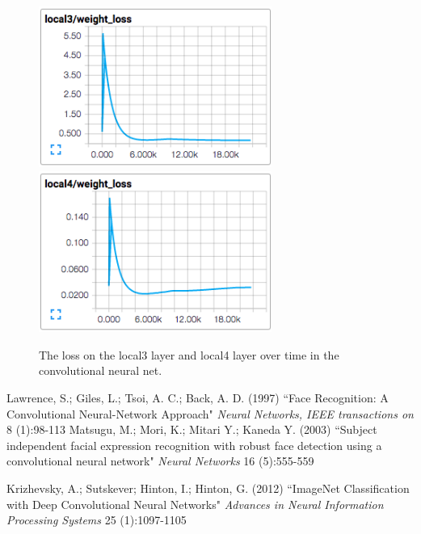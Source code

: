 \documentclass[11pt, twocolumn, twoside]{article}
\begin{document}
\begin{figure}
	\centering
	\includegraphics[width=3in]{local3_loss}
	\includegraphics[width=3in]{local4_loss}
	\caption{The loss on the local3 layer and local4 layer over time in the convolutional neural net.}
	\label{fig:layer_loss}
\end{figure}


\begin{thebibliography}{9}
Lawrence, S.; Giles, L.; Tsoi, A. C.; Back, A. D. (1997)
``Face Recognition: A Convolutional Neural-Network Approach"
\textit{Neural Networks, IEEE transactions on} 8 (1):98-113
Matsugu, M.; Mori, K.; Mitari Y.; Kaneda Y. (2003)
``Subject independent facial expression recognition with robust face detection using a convolutional neural network"
\textit{Neural Networks} 16 (5):555-559


Krizhevsky, A.; Sutskever; Hinton, I.; Hinton, G. (2012)
``ImageNet Classification with Deep Convolutional Neural Networks"
\textit{Advances in Neural Information Processing Systems} 25 (1):1097-1105
\end{thebibliography}
\end{document}
